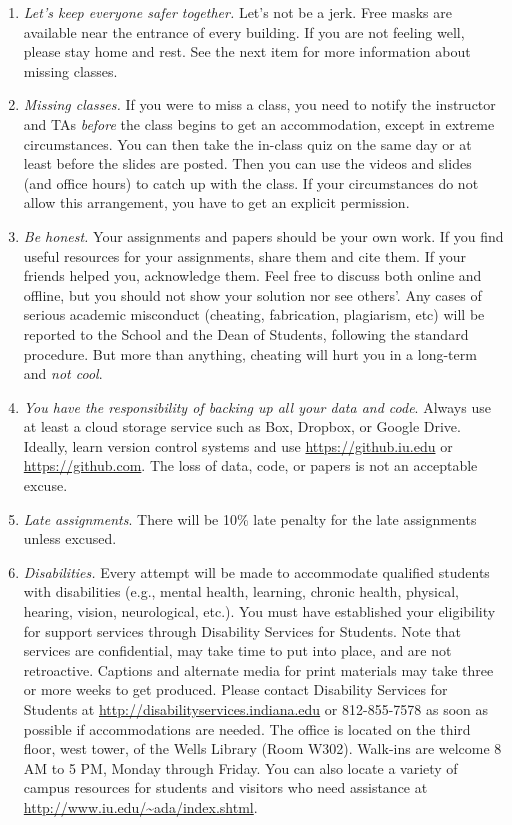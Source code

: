 \documentclass[11pt,article,oneside]{memoir} %
\begin{document}
\begin{enumerate}

\item \emph{Let's keep everyone safer together.} Let's not be a jerk. 
Free masks are available near the entrance of every building. 
If you are not feeling well, please stay home and rest. 
See the next item for more information about missing classes. 

\item \emph{Missing classes.} 
If you were to miss a class, you need to notify the instructor and TAs \emph{before} the class begins to get an accommodation, except in extreme circumstances. 
You can then take the in-class quiz on the same day or at least before the slides are posted. 
Then you can use the videos and slides (and office hours) to catch up with the class. 
If your circumstances do not allow this arrangement, you have to get an explicit permission. 


\item \emph{Be honest.} Your assignments and papers should be your own work.  
If you find useful resources for your assignments, share them and cite them. 
If your friends helped you, acknowledge them. 
Feel free to discuss both online and offline, but you should not show your solution nor see others'.  
Any cases of serious academic misconduct (cheating, fabrication, plagiarism, etc) will be reported to the School and the Dean of Students, following the standard procedure. 
But more than anything, cheating will hurt you in a long-term and \emph{not cool}.

\item \emph{You have the responsibility of backing up all your data and code}.
Always use at least a cloud storage service such as Box, Dropbox, or Google Drive. 
Ideally, learn version control systems and use \url{https://github.iu.edu} or \url{https://github.com}. 
The loss of data, code, or papers is not an acceptable excuse.

\item \emph{Late assignments}. There will be 10\% late penalty for the late assignments unless excused. 

\item \emph{Disabilities.} Every attempt will be made to accommodate qualified students with disabilities (e.g., mental health, learning, chronic health, physical, hearing, vision, neurological, etc.). 
You must have established your eligibility for support services through Disability Services for Students. 
Note that services are confidential, may take time to put into place, and are not retroactive.  
Captions and alternate media for print materials may take three or more weeks to get produced. 
Please contact Disability Services for Students at \url{http://disabilityservices.indiana.edu} or 812-855-7578 as soon as possible if accommodations are needed. 
The office is located on the third floor, west tower, of the Wells Library (Room W302). 
Walk-ins are welcome 8 AM to 5 PM, Monday through Friday. 
You can also locate a variety of campus resources for students and visitors who need assistance at \url{http://www.iu.edu/~ada/index.shtml}.


\end{enumerate}
\end{document}
